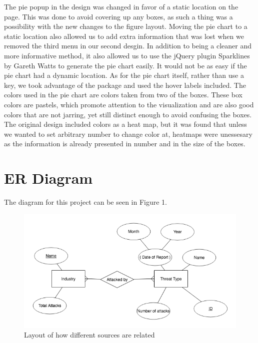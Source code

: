 \documentclass[journal]{vgtc}                %
\begin{document}
The pie popup in the design was changed in favor of a static location on the page. This was done to avoid covering up any 
boxes, as such a thing was a possibility with the new changes to the figure layout. Moving the pie chart to a static 
location also allowed us to add extra information that was lost when we removed the third menu in our second desgin. In 
addition to being a cleaner and more informative method, it also allowed us to use the jQuery plugin Sparklines by Gareth Watts to 
generate the pie chart easily. It would not be as easy if the pie chart had a dynamic location. As for the pie chart itself,
rather than use a key, we took advantage of the package and used the hover labels included. The colors used in the pie chart
are colors taken from two of the boxes. These box colors are pastels, which promote attention to the visualization and are 
also good colors that are not jarring, yet still distinct enough to avoid confusing the boxes. The original design included
colors as a heat map, but it was found that unless we wanted to set arbitrary number to change color at, heatmaps were 
unessesary as the information is already presented in number and in the size of the boxes.

\section{ER Diagram}
The diagram for this project can be seen in Figure 1.
\begin{figure}[tb]
 \centering %
 \includegraphics[width=\columnwidth]{erdigram}
 \caption{Layout of how different sources are related}
 \label{fig:sample}
\end{figure}
\end{document}

